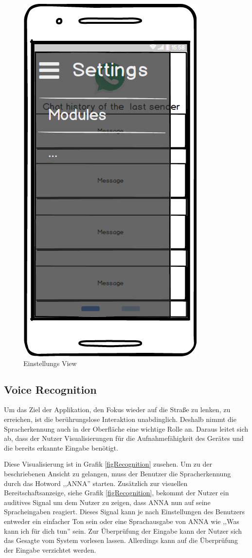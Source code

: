 \begin{figure}[h]
	\centering
  \includegraphics[scale=0.5]{images/Settings.png}
	\caption{Einstellungs View}
	\label{figSettings}
\end{figure}

\subsection{Voice Recognition}
Um das Ziel der Applikation, den Fokus wieder auf die Straße zu lenken, zu erreichen, ist die berührungslose Interaktion unabdinglich. Deshalb nimmt die Spracherkennung auch in der Oberfläche eine wichtige Rolle an. Daraus leitet sich ab, dass der Nutzer Visualisierungen für die Aufnahmefähigkeit des Gerätes und die bereits erkannte Eingabe benötigt.

Diese Visualisierung ist in Grafik \ref{figRecognition} zusehen. Um zu der beschriebenen Ansicht zu gelangen, muss der Benutzer die Spracherkennung durch das Hotword ,,ANNA'' starten. Zusätzlich zur visuellen Bereitschaftsanzeige, siehe Grafik \ref{figRecognition}, bekommt der Nutzer ein auditives Signal um dem Nutzer zu zeigen, dass \ac{ANNA} nun auf seine Spracheingaben reagiert. Dieses Signal kann je nach Einstellungen des Benutzers entweder ein einfacher Ton sein oder eine Sprachausgabe von \ac{ANNA} wie ,,Was kann ich für dich tun'' sein.
Zur Überprüfung der Eingabe kann der Nutzer sich das Gesagte vom System vorlesen lassen. Allerdings kann auf die Überprüfung der Eingabe verzichtet werden.

